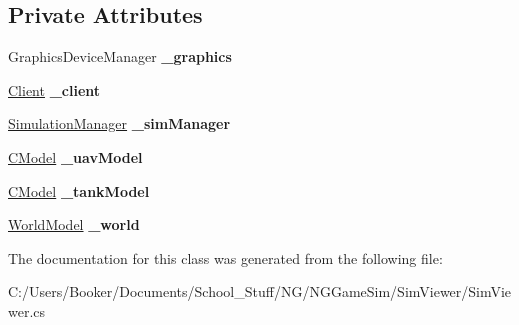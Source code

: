 \subsection*{Private Attributes}
\begin{DoxyCompactItemize}
\item 
\mbox{\label{class_n_g_sim_1_1_sim_viewer_a29c1a85fec105b9a198248084482cacc}} 
Graphics\+Device\+Manager {\bfseries \+\_\+graphics}
\item 
\mbox{\label{class_n_g_sim_1_1_sim_viewer_a1de083ff715ed5b2bd5cf10187eaf4c2}} 
\hyperlink{class_n_g_sim_1_1_network_1_1_client}{Client} {\bfseries \+\_\+client}
\item 
\mbox{\label{class_n_g_sim_1_1_sim_viewer_a36d61b6780ef398eb703a256e009dcf8}} 
\hyperlink{class_n_g_sim_1_1_simulation_manager}{Simulation\+Manager} {\bfseries \+\_\+sim\+Manager}
\item 
\mbox{\label{class_n_g_sim_1_1_sim_viewer_a8a904c04cd64488c9eaca0ef7fb5f5f3}} 
\hyperlink{class_n_g_sim_1_1_graphics_1_1_c_model}{C\+Model} {\bfseries \+\_\+uav\+Model}
\item 
\mbox{\label{class_n_g_sim_1_1_sim_viewer_aa1ca66c64a9773e2f84018432cec8628}} 
\hyperlink{class_n_g_sim_1_1_graphics_1_1_c_model}{C\+Model} {\bfseries \+\_\+tank\+Model}
\item 
\mbox{\label{class_n_g_sim_1_1_sim_viewer_a7e7d11b5585ebd7f8894c6f7d38c3fb3}} 
\hyperlink{class_n_g_sim_1_1_graphics_1_1_world_model}{World\+Model} {\bfseries \+\_\+world}
\end{DoxyCompactItemize}


The documentation for this class was generated from the following file\+:\begin{DoxyCompactItemize}
\item 
C\+:/\+Users/\+Booker/\+Documents/\+School\+\_\+\+Stuff/\+N\+G/\+N\+G\+Game\+Sim/\+Sim\+Viewer/Sim\+Viewer.\+cs\end{DoxyCompactItemize}
